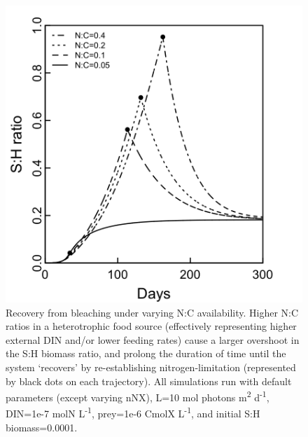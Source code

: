 \documentclass[]{elsarticle} %
\makeatletter
\def\maxwidth{\ifdim\Gin@nat@width>\linewidth\linewidth
\else\Gin@nat@width\fi}
\let\Oldincludegraphics\includegraphics
\renewcommand{\includegraphics}[1]{\Oldincludegraphics[width=\maxwidth]{#1}}
\makeatother
\begin{document}
\begin{figure}[htbp]
\centering
\includegraphics{../img/Fig8.png}
\caption{Recovery from bleaching under varying N:C availability. Higher
N:C ratios in a heterotrophic food source (effectively representing
higher external DIN and/or lower feeding rates) cause a larger overshoot
in the S:H biomass ratio, and prolong the duration of time until the
system `recovers' by re-establishing nitrogen-limitation (represented by
black dots on each trajectory). All simulations run with default
parameters (except varying nNX), L=10 mol photons m\textsuperscript{2}
d\textsuperscript{-1}, DIN=1e-7 molN L\textsuperscript{-1}, prey=1e-6
CmolX L\textsuperscript{-1}, and initial S:H biomass=0.0001.}
\end{figure}
\end{document}
